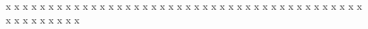 \documentclass{article}%
\begin{document}
x\newline%
x\newline%
x\newline%
x\newline%
x\newline%
x\newline%
x\newline%
x\newline%
x\newline%
x\newline%
x\newline%
x\newline%
x\newline%
x\newline%
x\newline%
x\newline%
x\newline%
x\newline%
x\newline%
x\newline%
x\newline%
x\newline%
x\newline%
x\newline%
x\newline%
x\newline%
x\newline%
x\newline%
x\newline%
x\newline%
x\newline%
x\newline%
x\newline%
x\newline%
x\newline%
x\newline%
x\newline%
x\newline%
x\newline%
x\newline%
x\newline%
x\newline%
x\newline%
x\newline%
x\newline%
x\newline%
x\newline%
x\newline%
x\newline%
x\newline%
x\newline%
\end{document}
